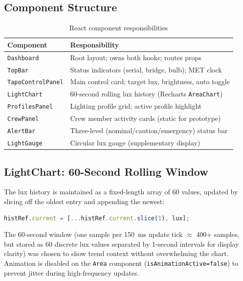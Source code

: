 \documentclass[12pt,letterpaper]{article}
\begin{document}
\subsection{Component Structure}

\begin{table}[H]
  \centering
  \caption{React component responsibilities}
  \label{tab:components}
  \begin{tabular}{ll}
    \toprule
    \textbf{Component} & \textbf{Responsibility} \\
    \midrule
    \texttt{Dashboard}        & Root layout; owns both hooks; routes props \\
    \texttt{TopBar}           & Status indicators (serial, bridge, bulb); MET clock \\
    \texttt{TapoControlPanel} & Main control card; target lux, brightness, auto toggle \\
    \texttt{LightChart}       & 60-second rolling lux history (Recharts \texttt{AreaChart}) \\
    \texttt{ProfilesPanel}    & Lighting profile grid; active profile highlight \\
    \texttt{CrewPanel}        & Crew member activity cards (static for prototype) \\
    \texttt{AlertBar}         & Three-level (nominal/caution/emergency) status bar \\
    \texttt{LightGauge}       & Circular lux gauge (supplementary display) \\
    \bottomrule
  \end{tabular}
\end{table}

\subsection{LightChart: 60-Second Rolling Window}

The lux history is maintained as a fixed-length array of 60 values, updated
by slicing off the oldest entry and appending the newest:

\begin{lstlisting}[language=JavaScript, caption={Rolling history update}]
histRef.current = [...histRef.current.slice(1), lux];
\end{lstlisting}

The 60-second window (one sample per 150~ms update tick $\approx$ 400+ samples,
but stored as 60 discrete lux values separated by 1-second intervals for
display clarity) was chosen to show trend context without overwhelming the
chart. Animation is disabled on the \texttt{Area} component
(\texttt{isAnimationActive=false}) to prevent jitter during high-frequency
updates.
\end{document}
